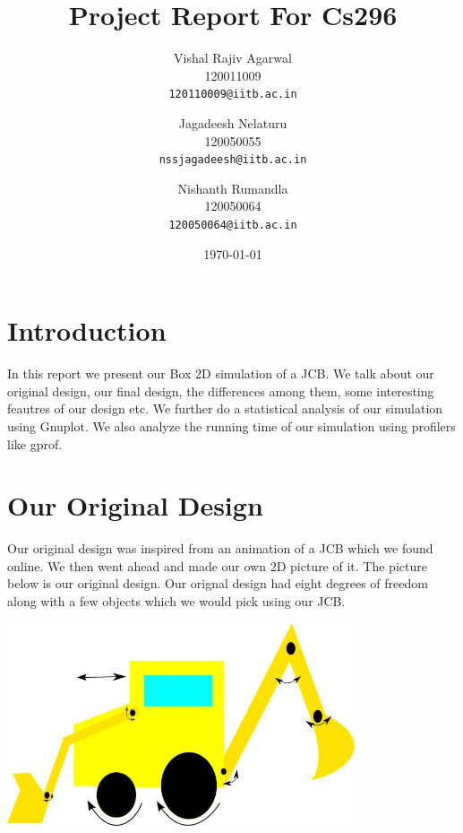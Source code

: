 \documentclass[11pt]{article}
\begin{document}
\title{Project Report For Cs296}

\author{
	Vishal Rajiv Agarwal\\
	120011009\\
	\texttt{120110009@iitb.ac.in}
	\and
	Jagadeesh Nelaturu\\
	120050055\\
	\texttt{nssjagadeesh@iitb.ac.in}
	\and
	Nishanth Rumandla\\
	120050064\\
	\texttt{120050064@iitb.ac.in}}

\date{\today}

\maketitle

\section{Introduction}
	In this report we present our Box 2D simulation of a JCB. We talk about our original design, our final design, the differences among them, some interesting feautres of our design etc. We further do a statistical analysis of our simulation using Gnuplot. We also analyze the running time of our simulation using profilers like gprof.  
\section{Our Original Design}
	Our original design was inspired from an animation of a JCB which we found online. We then went ahead and made our own 2D picture of it. The picture below is our original design. Our orignal design had eight degrees of freedom along with a few objects which we would pick using our JCB. 
	\begin{center}\includegraphics[height=6cm]{BullDozerDesign.jpg}\end{center}
\end{document}
